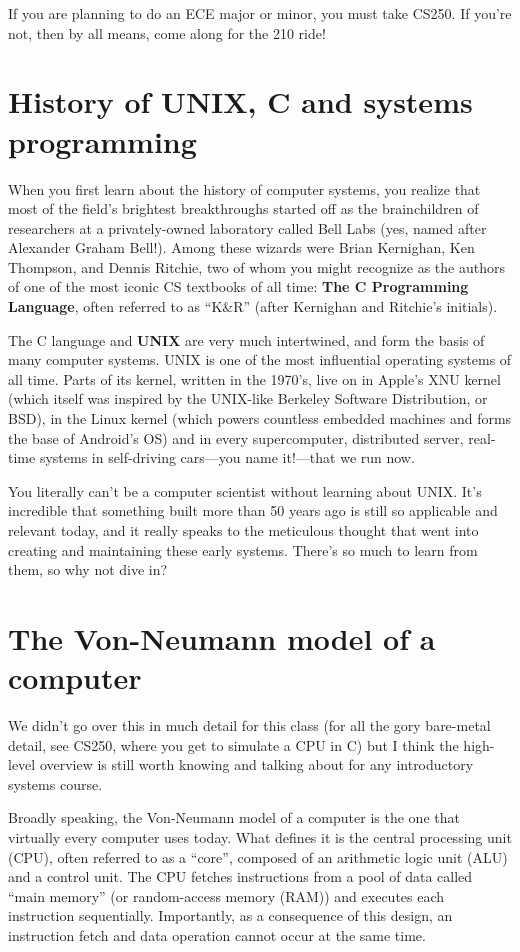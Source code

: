 \documentclass[fontsize=12pt,twoside=on,openright,parskip=half]{scrbook}
\begin{document}
If you are planning to do an ECE major or minor, you must take CS250. If you’re
not, then by all means, come along for the 210 ride! 

\section*{History of UNIX, C and systems programming}

When you first learn about the history of computer systems, you realize that
most of the field’s brightest breakthroughs started off as the brainchildren of
researchers at a privately-owned laboratory called Bell Labs (yes, named after
Alexander Graham Bell!). Among these wizards were Brian Kernighan, Ken
Thompson, and Dennis Ritchie, two of whom you might recognize as the authors of
one of the most iconic CS textbooks of all time: \textbf{The C Programming
Language}, often referred to as “K\&R” (after Kernighan and Ritchie’s initials).

The C language and \textbf{UNIX} are very much intertwined, and form the basis
of many computer systems. UNIX is one of the most influential operating systems
of all time. Parts of its kernel, written in the 1970’s, live on in Apple’s XNU
kernel (which itself was inspired by the UNIX-like Berkeley Software
Distribution, or BSD), in the Linux kernel (which powers countless embedded
machines and forms the base of Android’s OS) and in every supercomputer,
distributed server, real-time systems in self-driving cars—you name it!—that we
run now. 

You literally can’t be a computer scientist without learning about UNIX. It’s
incredible that something built more than 50 years ago is still so applicable
and relevant today, and it really speaks to the meticulous thought that went
into creating and maintaining these early systems. There’s so much to learn
from them, so why not dive in?

\section*{The Von-Neumann model of a computer}

We didn’t go over this in much detail for this class (for all the gory
bare-metal detail, see CS250, where you get to simulate a CPU in C) but I think
the high-level overview is still worth knowing and talking about for any
introductory systems course.

Broadly speaking, the Von-Neumann model of a computer is the one that virtually
every computer uses today. What defines it is the central processing unit
(CPU), often referred to as a “core”, composed of an arithmetic logic unit
(ALU) and a control unit. The CPU fetches instructions from a pool of data
called “main memory” (or random-access memory (RAM)) and executes each
instruction sequentially. Importantly, as a consequence of this design, an
instruction fetch and data operation cannot occur at the same time.
\end{document}

